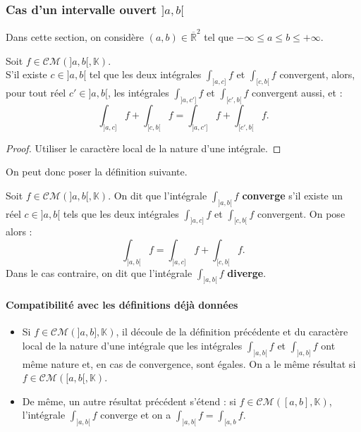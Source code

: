 \documentclass[french]{article}
\newcommand{\R}{\mathbb{R}}
\newcommand{\K}{\mathbb{K}}
\theoremstyle{plain}
\theoremstyle{definition}
\theoremstyle{remark}
\begin{document}
\subsubsection*{Cas d'un intervalle ouvert $]a,b[$}

Dans cette section, on considère $(a,b)\in\overline{\R}^2$ tel que $-\infty\leqslant a\leqslant b\leqslant+\infty$.

\begin{lem}%
	Soit $f\in\mathcal{CM}(]a,b[,\K)$.\\
	S'il existe $c\in]a,b[$ tel que les deux intégrales $\displaystyle\int_{]a,c]}f$ et $\displaystyle\int_{[c,b[}f$ convergent, alors, pour tout réel $c'\in]a,b[$, les intégrales $\displaystyle\int_{]a,c']}f$ et $\displaystyle\int_{[c',b[}f$ convergent aussi, et :
	$$\int_{]a,c]}f+\int_{[c,b[}f=\int_{]a,c']}f+\int_{[c',b[}f.$$
\end{lem}
\begin{proof}
	Utiliser le caractère local de la nature d'une intégrale.
\end{proof}

On peut donc poser la définition suivante.

\begin{dfn}
	Soit $f\in\mathcal{CM}(]a,b[,\K)$. On dit que l'intégrale $\displaystyle\int_{]a,b[}f$ \textbf{converge} s'il existe un réel $c\in]a,b[$ tels que les deux intégrales $\displaystyle\int_{]a,c]}f$ et $\displaystyle\int_{[c,b[}f$ convergent. On pose alors : 
	$$\int_{]a,b[}f=\int_{]a,c]}f+\int_{[c,b[}f.$$ Dans le cas contraire, on dit que l'intégrale $\displaystyle\int_{]a,b[}f$ \textbf{diverge}.
\end{dfn}

\paragraph{Compatibilité avec les définitions déjà données}
\begin{itemize}
	\item Si $f\in\mathcal{CM}(]a,b],\K)$, il découle de la définition précédente et du caractère local de la nature d'une intégrale que les intégrales $\displaystyle\int_{]a,b[}f$ et $\displaystyle\int_{]a,b]}f$ ont même nature et, en cas de convergence, sont égales. On a le même résultat si $f\in\mathcal{CM}([a,b[,\K)$.
	\item De même, un autre résultat précédent s'étend : si $f\in\mathcal{CM}([a,b],\K)$, l'intégrale $\displaystyle\int_{]a,b[}f$ converge et on a $\displaystyle\int_{]a,b[}f=\int_{[a,b}f$.
\end{itemize}
\end{document}

